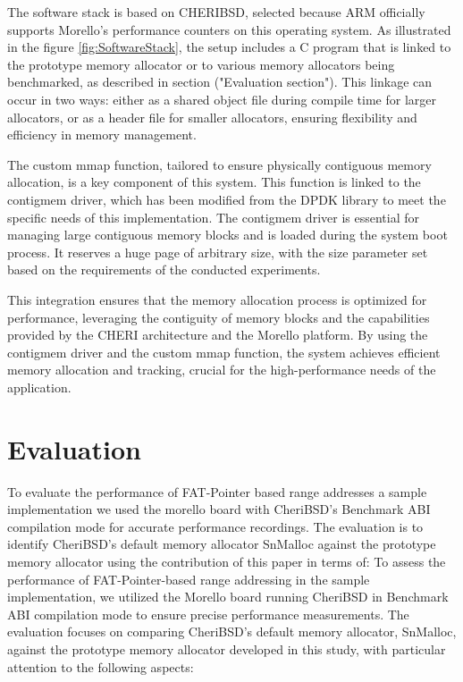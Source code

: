 \documentclass[acmsmall,screen,review]{acmart}
\begin{document}
The software stack is based on CHERIBSD, selected because ARM officially supports Morello's performance 
counters on this operating system. As illustrated in the figure \ref{fig:SoftwareStack}, the setup includes a C program that 
is linked to the prototype memory allocator or to various memory allocators being benchmarked, as described 
in section ("Evaluation section"). This linkage can occur in two ways: either as a shared object file during compile time 
for larger allocators, or as a header file for smaller allocators, ensuring flexibility and efficiency 
in memory management.

The custom mmap function, tailored to ensure physically contiguous memory allocation, is a key component 
of this system. This function is linked to the contigmem driver, which has been modified from the DPDK library 
to meet the specific needs of this implementation. The contigmem driver is essential for managing large contiguous 
memory blocks and is loaded during the system boot process. It reserves a huge page of arbitrary size, with the 
size parameter set based on the requirements of the conducted experiments.

This integration ensures that the memory allocation process is optimized for performance, leveraging the contiguity 
of memory blocks and the capabilities provided by the CHERI architecture and the Morello platform. By using the 
contigmem driver and the custom mmap function, the system achieves efficient memory allocation and tracking, 
crucial for the high-performance needs of the application.

\section{Evaluation}
To evaluate the performance of FAT-Pointer based range addresses a sample implementation we used
the morello board with CheriBSD's Benchmark ABI compilation mode for accurate performance recordings. 
The evaluation is to identify CheriBSD's default memory allocator SnMalloc against the prototype memory 
allocator using the contribution of this paper in terms of: 
To assess the performance of FAT-Pointer-based range addressing in the sample implementation, we utilized the 
Morello board running CheriBSD in Benchmark ABI compilation mode to ensure precise performance measurements. 
The evaluation focuses on comparing CheriBSD's default memory allocator, SnMalloc, against the prototype 
memory allocator developed in this study, with particular attention to the following aspects:
\end{document}
